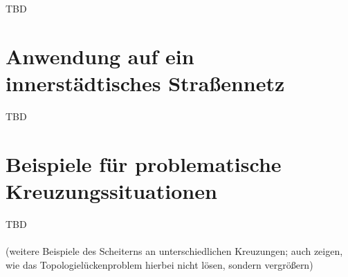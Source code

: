 \documentclass[../main/thesis.tex]{subfiles}
\begin{document}
TBD



\chapter{Anwendung auf ein innerstädtisches Straßennetz}
\label{appx:fullpage-examples-2}

TBD



\setcounter{chapter}{5}
\chapter{Beispiele für problematische Kreuzungssituationen}
\label{appx:junction-examples}

TBD\\
\\
(weitere Beispiele des Scheiterns an unterschiedlichen Kreuzungen; auch zeigen, wie  das Topologielückenproblem hierbei nicht lösen, sondern vergrößern)





\end{document}
